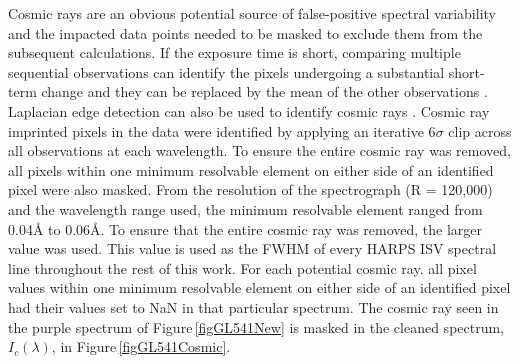 Cosmic rays are an obvious potential source of false-positive spectral variability and the impacted data points needed to be masked to exclude them from the subsequent calculations. If the exposure time is short, comparing multiple sequential observations can identify the pixels undergoing a substantial short-term change and they can be replaced by the mean of the other observations \citep{2000Fixsen}. Laplacian edge detection can also be used to identify cosmic rays \citep{2001VanDokkum}. Cosmic ray imprinted pixels in the data were identified by applying an iterative 6$\sigma$ clip across all observations at each wavelength. To ensure the entire cosmic ray was removed, all pixels within one minimum resolvable element on either side of an identified pixel were also masked. From the resolution of the spectrograph (R = 120,000) and the wavelength range used, the minimum resolvable element ranged from 0.04\hbox{\AA} to 0.06\hbox{\AA}. To ensure that the entire cosmic ray was removed, the larger value was used. This value is used as the FWHM of every HARPS ISV spectral line throughout the rest of this work. For each potential cosmic ray. all pixel values within one minimum resolvable element on either side of an identified pixel had their values set to NaN in that particular spectrum. The cosmic ray seen in the purple spectrum of Figure\,\ref{figGL541New} is masked in the cleaned spectrum, $I_{c}(\lambda)$, in Figure\,\ref{figGL541Cosmic}.

